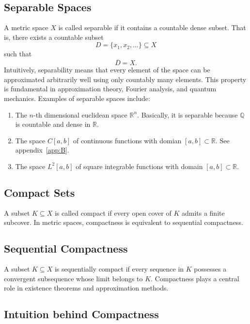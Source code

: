 \documentclass[aps,prl,twocolumn,groupedaddress]{revtex4-2}
\newcommand{\QQ}{\mathbb{Q}}
\newcommand{\RR}{\mathbb{R}}
\begin{document}
\subsection{Separable Spaces}

A metric space $X$ is called separable if it contains a countable dense subset.
That is, there exists a countable subset
$$
D=\{x_1,x_2,\dots\}\subseteq X
$$
such that
$$
\overline{D}=X.
$$
Intuitively, separability means that every element of the space can be approximated arbitrarily well using only countably many elements.
This property is fundamental in approximation theory, Fourier analysis, and quantum mechanics.
Examples of separable spaces include:
\begin{enumerate}
\item The $n$-th dimensional euclidean space $\mathbb{R}^n$.
Basically, it is separable because $\QQ$ is countable and dense in $\RR$.
\item The space $C[a,b]$ of continuous functions with domian $[a,b]\subset \RR$.
See appendix~\ref{app:B}.
\item The space $L^2[a,b]$ of square integrable functions with domain $[a,b]\subset \RR$.
\end{enumerate}

\subsection{Compact Sets}

A subset $K\subseteq X$ is called compact if every open cover of $K$ admits a finite subcover.
In metric spaces, compactness is equivalent to sequential compactness.

\subsection{Sequential Compactness}

A subset $K\subseteq X$ is sequentially compact if every sequence in $K$ possesses a convergent subsequence whose limit belongs to $K$.
Compactness plays a central role in existence theorems and approximation methods.

\subsection{Intuition behind Compactness}
\end{document}

